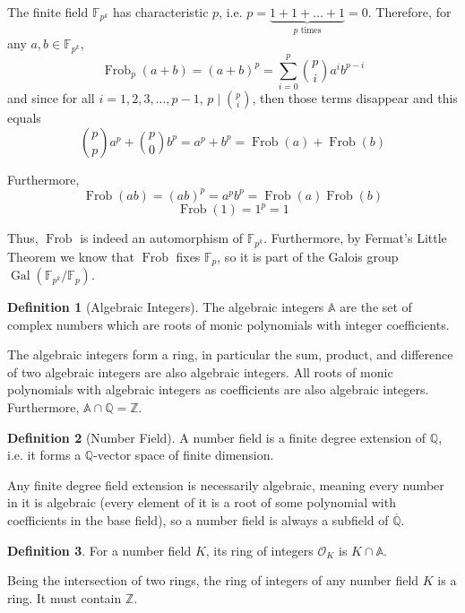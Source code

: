 \documentclass{article}
\theoremstyle{definition}
\newtheorem{definition}{Definition}[section]
\theoremstyle{definition}
\theoremstyle{definition}
\begin{document}
The finite field $\mathbb F_{p^k}$ has characteristic $p$, i.e. $p=\underbrace{1+1+\dots+1}_{p\text{ times}}=0$. Therefore, for any $a,b\in\mathbb F_{p^k}$,
$$\operatorname{Frob}_p(a+b)=(a+b)^p=\sum_{i=0}^p\binom{p}{i}a^ib^{p-i}$$
and since for all $i=1,2,3,\dots,p-1$, $p\mid\binom{p}{i}$, then those terms disappear and this equals
$$\binom{p}{p}a^p+\binom{p}{0}b^p=a^p+b^p=\operatorname{Frob}(a)+\operatorname{Frob}(b)$$

Furthermore,
$$\operatorname{Frob}(ab)=(ab)^p=a^pb^p=\operatorname{Frob}(a)\operatorname{Frob}(b)$$
$$\operatorname{Frob}(1)=1^p=1$$

Thus, $\operatorname{Frob}$ is indeed an automorphism of $\mathbb F_{p^k}$. Furthermore, by Fermat's Little Theorem we know that $\operatorname{Frob}$ fixes $\mathbb F_p$, so it is part of the Galois group $\operatorname{Gal}(\mathbb F_{p^k}/\mathbb F_p)$.


\begin{definition}[Algebraic Integers]
    The algebraic integers $\mathbb A$ are the set of complex numbers which are roots of monic polynomials with integer coefficients.
\end{definition}
The algebraic integers form a ring, in particular the sum, product, and difference of two algebraic integers are also algebraic integers. All roots of monic polynomials with algebraic integers as coefficients are also algebraic integers. Furthermore, $\mathbb A\cap\mathbb Q=\mathbb Z$.

\begin{definition}[Number Field]
    A number field is a finite degree extension of $\mathbb Q$, i.e. it forms a $\mathbb Q$-vector space of finite dimension.
\end{definition}

Any finite degree field extension is necessarily algebraic, meaning every number in it is algebraic (every element of it is a root of some polynomial with coefficients in the base field), so a number field is always a subfield of $\overline{\mathbb Q}$.

\begin{definition}
    For a number field $K$, its ring of integers $\mathcal O_K$ is $K\cap\mathbb A$.
\end{definition}

Being the intersection of two rings, the ring of integers of any number field $K$ is a ring. It must contain $\mathbb Z$.
\end{document}
